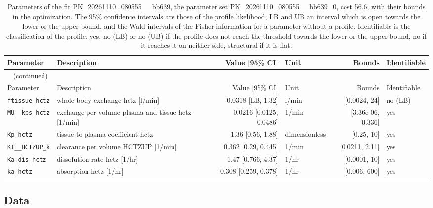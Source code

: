 \documentclass{article}
\begin{document}
\begin{longtable}{llrlrl}
\caption{Parameters of the fit PK\_20261110\_080555\_\_bb639, the parameter set PK\_20261110\_080555\_\_bb639\_0, cost 56.6, with their bounds in the optimization. The 95\% confidence intervals are those of the profile likelihood, LB and UB an interval which is open towards the lower or the upper bound, and the Wald intervals of the Fisher information for a parameter without a profile. Identifiable is the classification of the profile: yes, no (LB) or no (UB) if the profile does not reach the threshold towards the lower or the upper bound, no if it reaches it on neither side, structural if it is flat.}\label{tab:parameters:PK_20261110_080555__bb639} \\
\toprule
Parameter & Description & Value [95\% CI] & Unit & Bounds & Identifiable \\
\midrule
\endfirsthead
\multicolumn{6}{l}{\small\tablename~\thetable{} (continued)} \\
\toprule
Parameter & Description & Value [95\% CI] & Unit & Bounds & Identifiable \\
\midrule
\endhead
\bottomrule
\endlastfoot
\texttt{ftissue\_hctz} & whole-body exchange hctz [l/min] & 0.0318 [LB, 1.32] & l/min & [0.0024, 24] & no (LB) \\
\texttt{MU\_\_kps\_hctz} & exchange per volume plasma and tissue hctz [1/min] & 0.0216 [0.0125, 0.0486] & 1/min & [3.36e-06, 0.336] & yes \\
\texttt{Kp\_hctz} & tissue to plasma coefficient hctz & 1.36 [0.56, 1.88] & dimensionless & [0.25, 10] & yes \\
\texttt{KI\_\_HCTZUP\_k} & clearance per volume HCTZUP [1/min] & 0.362 [0.29, 0.445] & 1/min & [0.0211, 2.11] & yes \\
\texttt{Ka\_dis\_hctz} & dissolution rate hctz [1/hr] & 1.47 [0.766, 4.37] & 1/hr & [0.0001, 10] & yes \\
\texttt{ka\_hctz} & absorption hctz [1/hr] & 0.308 [0.259, 0.378] & 1/hr & [0.006, 600] & yes \\
\end{longtable}

\subsection{Data}
\end{document}
